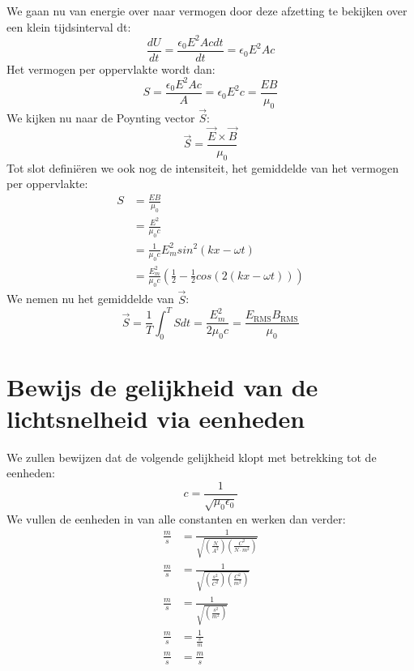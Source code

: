\documentclass[a4paper,kul]{kulakarticle} %
\begin{document}
We gaan nu van energie over naar vermogen door deze afzetting te bekijken over een klein tijdsinterval dt:
\begin{equation*}
	\frac{dU}{dt}=\frac{\epsilon_0E^2Acdt}{dt}= \epsilon_0E^2Ac
\end{equation*}
Het vermogen per oppervlakte wordt dan:
\begin{equation*}
	S = \frac{\epsilon_0E^2Ac}{A} = \epsilon_0E^2c = \frac{EB}{\mu_0}
\end{equation*}
We kijken nu naar de Poynting vector $\vec{S}$:
\begin{equation*}
	\vec{S} = \frac{\vec{E}\times\vec{B}}{\mu_0}
\end{equation*}
\newpage
Tot slot definiëren we ook nog de intensiteit, het gemiddelde van het vermogen per oppervlakte:
\begin{align*}
	S&= \frac{EB}{\mu_0}\\
	&= \frac{E^2}{\mu_0c}\\
	&= \frac{1}{\mu_0c}E^2_msin^2(kx-\omega t)\\
	&=\frac{E^2_m}{\mu_0c}(\frac{1}{2}-\frac{1}{2}cos(2(kx-\omega t)))
\end{align*} 
We nemen nu het gemiddelde van $\vec{S}$:
\begin{equation*}
	\vec{S}=\frac{1}{T}\int_{0}^{T}Sdt=\frac{E^2_m}{2\mu_0c}=\frac{E_{\text{RMS}}B_{\text{RMS}}}{\mu_0}
\end{equation*}
\newpage
\section{Bewijs de gelijkheid van de lichtsnelheid via eenheden}
We zullen bewijzen dat de volgende gelijkheid klopt met betrekking tot de eenheden:
\begin{equation*}
	c = \frac{1}{\sqrt{\mu_0\epsilon_0}}
\end{equation*}
We vullen de eenheden in van alle constanten en werken dan verder:
\begin{align*}
	\frac{m}{s} &= \frac{1}{\sqrt{(\frac{N}{A^2})(\frac{C^2}{N\cdot m^2})}}\\
	\frac{m}{s} &= \frac{1}{\sqrt{(\frac{s^2}{C^2})(\frac{C^2}{ m^2})}}\\
	\frac{m}{s} &= \frac{1}{\sqrt{(\frac{s^2}{m^2})}}\\
	\frac{m}{s} &= \frac{1}{\frac{s}{m}}\\
	\frac{m}{s} &= \frac{m}{s}	
\end{align*}
\newpage
\end{document}
